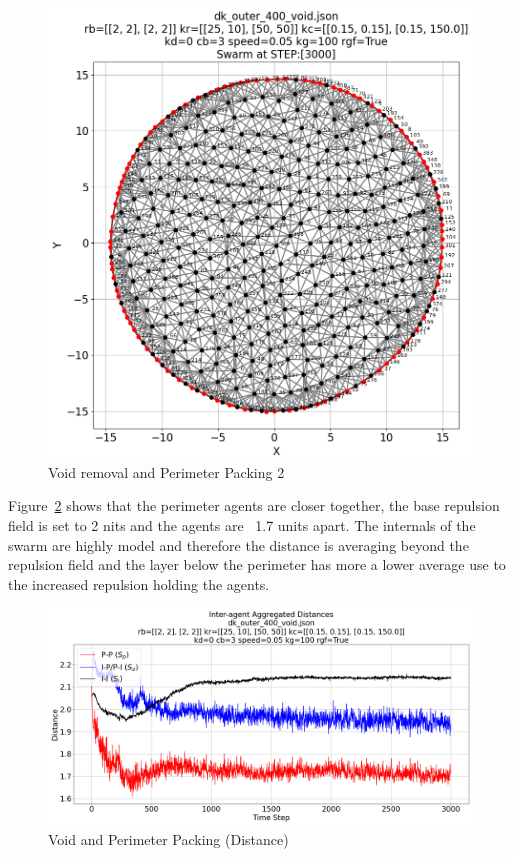 \documentclass[12pt,a4paper]{IEEEtran}
\begin{document}
\begin{figure}[H]
	\begin{center}
		\includegraphics[width=1.0\linewidth]{figures/voidPerim2}
	\end{center}
	\caption{Void removal and Perimeter Packing 2\label{fig:voidPerim2}}
\end{figure}

Figure~\ref{fig:voidPerimDistance} shows that the perimeter agents are closer together, the base repulsion field is set to 2 nits and the agents are ~1.7 units apart. The internals of the swarm are highly model and therefore the distance is averaging beyond the repulsion field and the layer below the perimeter has more a lower average use to the increased repulsion holding the agents.

\begin{figure}[H]
	\begin{center}
		\includegraphics[width=1.0\linewidth]{figures/voidPerimDistance}
	\end{center}
	\caption{Void and Perimeter Packing (Distance)\label{fig:voidPerimDistance}}
\end{figure}
\end{document}

